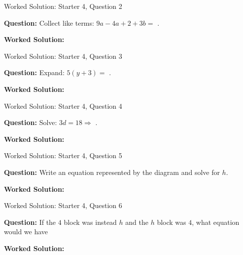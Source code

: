 \documentclass{beamer}
\newcommand{\ablank}[1]{%
  \alt<2>{\textcolor{red}{#1}}{\underline{\phantom{#1}}}%
}
\newcommand{\ashow}[1]{\uncover<2->{\textcolor{red}{\small #1}}}
\newcommand{\ashowq}[1]{\alt<2->{\textcolor{red}{\small #1}}{?}}
\begin{document}
\begin{frame}{Worked Solution: Starter 4, Question 2}

\textbf{Question:} Collect like terms: $9a-4a+2+3b=$\ablank{$5a+2+3b$}.

\textbf{Worked Solution:} \ashow{$9a-4a=5a$; the constant $2$ and the $b$-term $3b$ stay separate, so $5a+2+3b$.}

\end{frame}

\begin{frame}{Worked Solution: Starter 4, Question 3}

\textbf{Question:} Expand: $5(y+3)=$\ablank{$5y+15$}.

\textbf{Worked Solution:} \ashow{$5(y+3)=5y+5\cdot3=5y+15$.}

\end{frame}

\begin{frame}{Worked Solution: Starter 4, Question 4}

\textbf{Question:} Solve: $3d=18 \Rightarrow$\ablank{$d=6$}.

\textbf{Worked Solution:} \ashow{Divide both sides by $3$: $d=18/3=6$.}

\end{frame}

\begin{frame}{Worked Solution: Starter 4, Question 5}

\textbf{Question:} Write an equation represented by the diagram and solve for $h$.

\textbf{Worked Solution:} \ashow{The diagram gives $h+4+6=20$, so $h+10=20$, hence $h=10$.}

\end{frame}

\begin{frame}{Worked Solution: Starter 4, Question 6}

\textbf{Question:} If the $4$ block was instead $h$ and the $h$ block was $4$, what equation would we have\ashowq{~$4+h+6=20$.}

\textbf{Worked Solution:} \ashow{After swapping the labels, the equation is $4+h+6=20$, which still gives $h=10$.}

\end{frame}
\end{document}
